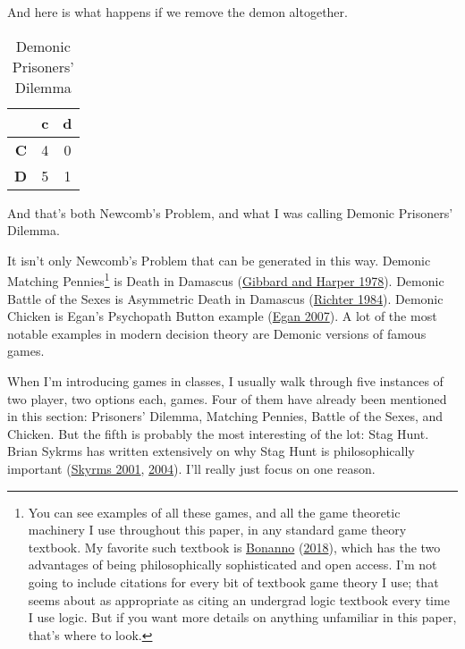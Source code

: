 \documentclass[
  12pt,
]{article}
\begin{document}
And here is what happens if we remove the demon altogether.

\begin{table}[H]

\caption{\label{tab:unnamed-chunk-6}Demonic Prisoners' Dilemma}
\centering
\begin{tabular}[t]{>{}r|cc}

\textbf{} & \textbf{c} & \textbf{d}\\
\midrule
\textbf{C} & 4 & 0\\
\textbf{D} & 5 & 1\\

\end{tabular}
\end{table}

And that's both Newcomb's Problem, and what I was calling Demonic
Prisoners' Dilemma.

It isn't only Newcomb's Problem that can be generated in this way.
Demonic Matching Pennies\footnote{You can see examples of all these
  games, and all the game theoretic machinery I use throughout this
  paper, in any standard game theory textbook. My favorite such textbook
  is \protect\hyperlink{ref-Bonanno2018}{Bonanno}
  (\protect\hyperlink{ref-Bonanno2018}{2018}), which has the two
  advantages of being philosophically sophisticated and open access. I'm
  not going to include citations for every bit of textbook game theory I
  use; that seems about as appropriate as citing an undergrad logic
  textbook every time I use logic. But if you want more details on
  anything unfamiliar in this paper, that's where to look.} is Death in
Damascus (\protect\hyperlink{ref-GibbardHarper1978}{Gibbard and Harper
1978}). Demonic Battle of the Sexes is Asymmetric Death in Damascus
(\protect\hyperlink{ref-Richter1984}{Richter 1984}). Demonic Chicken is
Egan's Psychopath Button example
(\protect\hyperlink{ref-Egan2007-EGASCT}{Egan 2007}). A lot of the most
notable examples in modern decision theory are Demonic versions of
famous games.

When I'm introducing games in classes, I usually walk through five
instances of two player, two options each, games. Four of them have
already been mentioned in this section: Prisoners' Dilemma, Matching
Pennies, Battle of the Sexes, and Chicken. But the fifth is probably the
most interesting of the lot: Stag Hunt. Brian Sykrms has written
extensively on why Stag Hunt is philosophically important
(\protect\hyperlink{ref-Skyrms2001}{Skyrms 2001},
\protect\hyperlink{ref-Skyrms2004}{2004}). I'll really just focus on one
reason.
\end{document}
